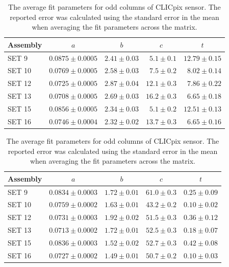 \begin{table}[h!]
\centering
\begin{tabular}{ l r r r r}
\hline
Assembly & \multicolumn{1}{c}{$a$} & \multicolumn{1}{c}{$b$} & \multicolumn{1}{c}{$c$} & \multicolumn{1}{c}{$t$} \\ 
\hline
SET 9   & $0.0875 \pm 0.0005$ & $2.41 \pm 0.03$ & $5.1 \pm 0.1$ & $12.79 \pm 0.15$ \\
SET 10 & $0.0769 \pm 0.0005$ & $2.58 \pm 0.03$ & $7.5 \pm 0.2$ & $8.02 \pm 0.14$ \\
SET 12 & $0.0725 \pm 0.0005$ & $2.87 \pm 0.04$ & $12.1 \pm 0.3$ & $7.86 \pm 0.22$  \\
SET 13 & $0.0708 \pm 0.0005$ & $2.69 \pm 0.03$ & $16.2 \pm 0.3$ & $6.65 \pm 0.18$ \\
SET 15 & $0.0856 \pm 0.0005$ & $2.34 \pm 0.03$ & $5.1 \pm 0.2$ & $12.51 \pm 0.13$ \\
SET 16 & $0.0746 \pm 0.0004$ & $2.32 \pm 0.02$ & $13.7 \pm 0.3$ & $6.65\pm 0.16$ \\
\hline
\end{tabular}
\caption[The average fit parameters for even columns of CLICpix sensor.  The reported error was calculated using the standard error in the mean when averaging the fit parameters across the matrix.]{The average fit parameters for even columns of CLICpix sensor.  The reported error was calculated using the standard error in the mean when averaging the fit parameters across the matrix.}
\label{table:clicpixfitparamseven}
\vspace{\floatsep}
\centering
\begin{tabular}{ l r r r r}
\hline
Assembly & \multicolumn{1}{c}{$a$} & \multicolumn{1}{c}{$b$} & \multicolumn{1}{c}{$c$} & \multicolumn{1}{c}{$t$} \\ 
\hline
SET 9   & $0.0834 \pm 0.0003$ & $1.72 \pm 0.01$ & $61.0 \pm 0.3$ & $0.25 \pm 0.09$ \\
SET 10 & $0.0759 \pm 0.0002$ & $1.63 \pm 0.01$ & $43.2 \pm 0.2$ & $0.10 \pm 0.02$ \\
SET 12 & $0.0731 \pm 0.0003$ & $1.92 \pm 0.02$ & $51.5 \pm 0.3$ & $0.36 \pm 0.12$ \\
SET 13 & $0.0713 \pm 0.0002$ & $1.72 \pm 0.01$ & $52.5 \pm 0.3$ & $0.18 \pm 0.07$ \\
SET 15 & $0.0836 \pm 0.0003$ & $1.52 \pm 0.02$ & $52.7 \pm 0.3$ & $0.42 \pm 0.08$ \\
SET 16  & $0.0727 \pm 0.0002$ & $1.49 \pm 0.01$ & $50.7 \pm 0.2$ & $0.10 \pm 0.03$ \\
\hline
\end{tabular}
\caption[The average fit parameters for odd columns of CLICpix sensor.  The reported error was calculated using the standard error in the mean when averaging the fit parameters across the matrix.]{The average fit parameters for odd columns of CLICpix sensor.  The reported error was calculated using the standard error in the mean when averaging the fit parameters across the matrix.}\label{table:clicpixfitparamsodd}
\end{table}

